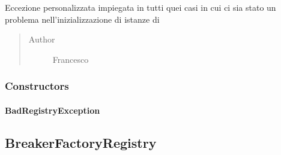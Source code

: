 \documentclass[letterpaper,10pt,italian,openany,oneside]{sphinxmanual}
\begin{document}
\begin{fulllineitems}
\label{\detokenize{source/it/unicam/cs/pa/mastermind/players/BadRegistryException:it.unicam.cs.pa.mastermind.players.BadRegistryException}}
Eccezione personalizzata impiegata in tutti quei casi in cui ci sia stato un problema nell’inizializzazione di istanze di 
\begin{quote}\begin{description}
\item[{Author}] \leavevmode
Francesco

\end{description}\end{quote}

\end{fulllineitems}



\subsubsection{Constructors}
\label{\detokenize{source/it/unicam/cs/pa/mastermind/players/BadRegistryException:constructors}}

\paragraph{BadRegistryException}
\label{\detokenize{source/it/unicam/cs/pa/mastermind/players/BadRegistryException:id1}}

\begin{fulllineitems}
\label{\detokenize{source/it/unicam/cs/pa/mastermind/players/BadRegistryException:it.unicam.cs.pa.mastermind.players.BadRegistryException.BadRegistryException(String)}}
\end{fulllineitems}



\subsection{BreakerFactoryRegistry}
\label{\detokenize{source/it/unicam/cs/pa/mastermind/players/BreakerFactoryRegistry:breakerfactoryregistry}}\label{\detokenize{source/it/unicam/cs/pa/mastermind/players/BreakerFactoryRegistry::doc}}
\end{document}
